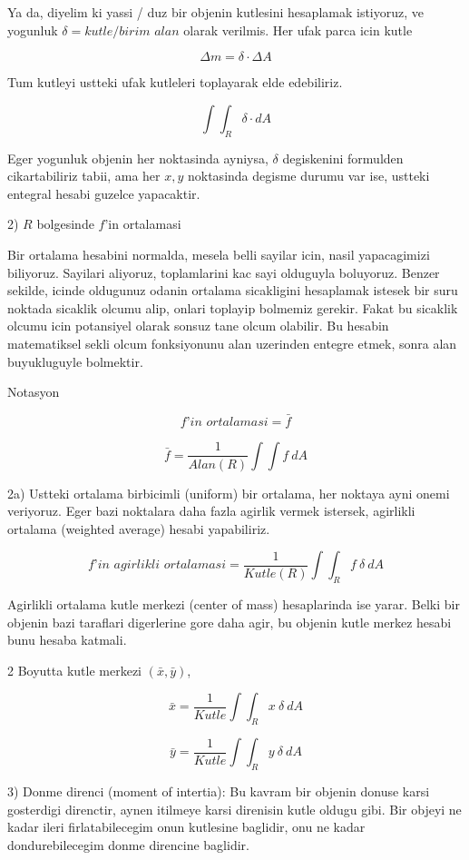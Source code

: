 \documentclass[12pt,fleqn]{article}\usepackage{../common}
\begin{document}
Ya da, diyelim ki yassi / duz bir objenin kutlesini hesaplamak istiyoruz,
ve yogunluk $\delta = kutle / \textit{birim alan}$ olarak verilmis. Her
ufak parca icin kutle

\[ \Delta m = \delta \cdot \Delta A \]

Tum kutleyi ustteki ufak kutleleri toplayarak elde edebiliriz. 

\[ \int \int_R \delta \cdot dA \]

Eger yogunluk objenin her noktasinda ayniysa, $\delta$ degiskenini
formulden cikartabiliriz tabii, ama her $x,y$ noktasinda degisme durumu var
ise, ustteki entegral hesabi guzelce yapacaktir.

2) $R$ bolgesinde $f$'in ortalamasi 

Bir ortalama hesabini normalda, mesela belli sayilar icin, nasil
yapacagimizi biliyoruz. Sayilari aliyoruz, toplamlarini kac sayi olduguyla
boluyoruz. Benzer sekilde, icinde oldugunuz odanin ortalama sicakligini
hesaplamak istesek bir suru noktada sicaklik olcumu alip, onlari toplayip
bolmemiz gerekir. Fakat bu sicaklik olcumu icin potansiyel olarak sonsuz
tane olcum olabilir. Bu hesabin matematiksel sekli olcum fonksiyonunu alan
uzerinden entegre etmek, sonra alan buyukluguyle bolmektir. 

Notasyon

\[ \textit{f'in ortalamasi} = \bar{f} \]

\[ \bar{f} = \frac{1}{Alan(R)} \int \int f \ dA \]

2a) Ustteki ortalama birbicimli (uniform) bir ortalama, her noktaya
ayni onemi veriyoruz. Eger bazi noktalara daha fazla agirlik vermek
istersek, agirlikli ortalama (weighted average) hesabi yapabiliriz.

\[ \textit{f'in agirlikli ortalamasi} = \frac{1}{Kutle(R)} 
\int \int_R f \ \delta \ dA
 \]

Agirlikli ortalama kutle merkezi (center of mass) hesaplarinda ise
yarar. Belki bir objenin bazi taraflari digerlerine gore daha agir, bu
objenin kutle merkez hesabi bunu hesaba katmali. 

2 Boyutta kutle merkezi $(\bar{x},\bar{y})$, 

\[  \bar{x}  = \frac{1}{Kutle} \int \int_R x \ \delta \ dA  \]

\[  \bar{y}  = \frac{1}{Kutle} \int \int_R y \ \delta \ dA  \]


3) Donme direnci (moment of intertia): Bu kavram bir objenin donuse
karsi gosterdigi direnctir, aynen itilmeye karsi direnisin kutle oldugu
gibi. Bir objeyi ne kadar ileri firlatabilecegim onun kutlesine baglidir,
onu ne kadar dondurebilecegim donme direncine baglidir. 
\end{document}
